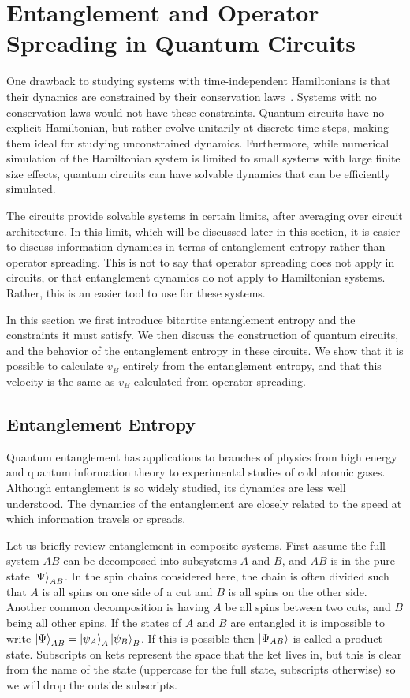 \section{Entanglement and Operator Spreading in Quantum Circuits} \label{sec:circuits}

One drawback to studying systems with time-independent Hamiltonians is that their dynamics are constrained by their conservation laws~\cite{Jonay18}. Systems with no conservation laws would not have these constraints. Quantum circuits have no explicit Hamiltonian, but rather evolve unitarily at discrete time steps, making them ideal for studying unconstrained dynamics. Furthermore, while numerical simulation of the Hamiltonian system is limited to small systems with large finite size effects, quantum circuits can have solvable dynamics that can be efficiently simulated.

The circuits provide solvable systems in certain limits, after averaging over circuit architecture. In this limit, which will be discussed later in this section, it is easier to discuss information dynamics in terms of entanglement entropy rather than operator spreading. This is not to say that operator spreading does not apply in circuits, or that entanglement dynamics do not apply to Hamiltonian systems. Rather, this is an easier tool to use for these systems.

In this section we first introduce bitartite entanglement entropy and the constraints it must satisfy. We then discuss the construction of quantum circuits, and the behavior of the entanglement entropy in these circuits. We show that it is possible to calculate $v_B$ entirely from the entanglement entropy, and that this velocity is the same as $v_B$ calculated from operator spreading.

\subsection{Entanglement Entropy} \label{sub:intro}

Quantum entanglement has applications to branches of physics from high energy and quantum information theory to experimental studies of cold atomic gases. Although entanglement is so widely studied, its dynamics are less well understood. The dynamics of the entanglement are closely related to the speed at which information travels or spreads. 

Let us briefly review entanglement in composite systems. First assume the full system $AB$ can be decomposed into subsystems $A$ and $B$, and $AB$ is in the pure state $\left|\Psi\right\rangle_{{AB}}$. In the spin chains considered here, the chain is often divided such that $A$ is all spins on one side of a cut and $B$ is all spins on the other side. Another common decomposition is having $A$ be all spins between two cuts, and $B$ being all other spins. If the states of $A$ and $B$ are entangled it is impossible to write $\left|\Psi\right\rangle_{AB} = \left|\psi_A\right\rangle_A \left|\psi_B\right\rangle_B$. If this is possible then $\left|\Psi_{{AB}}\right\rangle$ is called a product state. Subscripts on kets represent the space that the ket lives in, but this is clear from the name of the state (uppercase for the full state, subscripts otherwise) so we will drop the outside subscripts.

